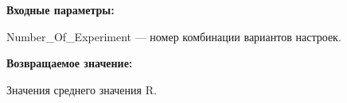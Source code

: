 \textbf{Входные параметры:}

Number\_Of\_Experiment --- номер комбинации вариантов настроек.

\textbf{Возвращаемое значение:}

Значения среднего значения R.
